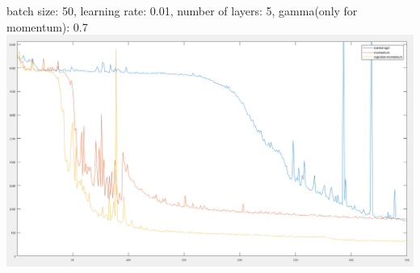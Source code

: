 \documentclass{article}
\numberwithin{equation}{section}
\begin{document}
batch size: 50, learning rate: 0.01, number of layers: 5, gamma(only for momentum): 0.7\\
\includegraphics[width=\textwidth]{rej_m_swissroll_5layers.png}
\end{document}
